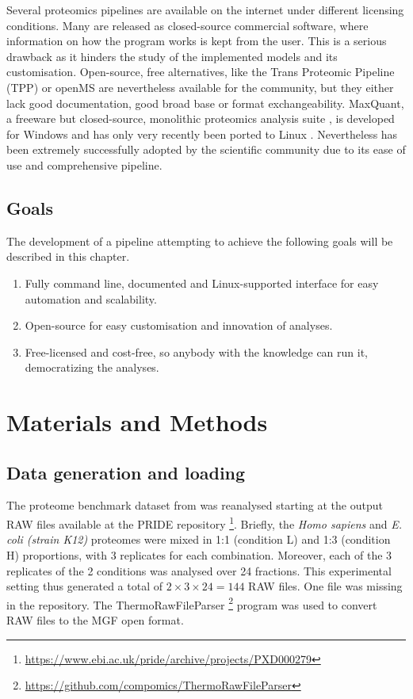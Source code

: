 Several proteomics pipelines are available on the internet under different licensing conditions. Many are released as closed-source commercial software, where information on how the program works is kept from the user. This is a serious drawback as it hinders the study of the implemented models and its customisation. Open-source, free alternatives, like the Trans Proteomic Pipeline (\ac{TPP}) \cite{Deutsch2011} or openMS \cite{Sturm2008} are nevertheless available for the community, but they either lack good documentation, good broad base or format exchangeability. MaxQuant, a freeware but closed-source, monolithic proteomics analysis suite \cite{Cox2008}, is developed for Windows and has only very recently been ported to Linux \cite{Sinitcyn2018}. Nevertheless has been extremely successfully adopted by the scientific community due to its ease of use and comprehensive pipeline.

\subsection{Goals}

The development of a pipeline attempting to achieve the following goals will be described in this chapter.

\begin{enumerate}

\item Fully command line, documented and Linux-supported interface for easy automation and scalability.
\item Open-source for easy customisation and innovation of analyses.
\item Free-licensed and cost-free, so anybody with the knowledge can run it, democratizing the analyses.
\end{enumerate}

\section{Materials and Methods}

\subsection{Data generation and loading}

The proteome benchmark dataset from \cite{Cox2014} was reanalysed starting at the output RAW files available at the PRIDE repository \footnote{\href{https://www.ebi.ac.uk/pride/archive/projects/PXD000279}{https://www.ebi.ac.uk/pride/archive/projects/PXD000279}}. Briefly, the \textit{Homo sapiens} and \textit{E. coli (strain K12)} proteomes were mixed in 1:1 (condition L) and 1:3 (condition H) proportions, with 3 replicates for each combination. Moreover, each of the 3 replicates of the 2 conditions was analysed over 24 fractions. This experimental setting thus generated a total of $2 \times 3 \times 24=144$ RAW files. One file was missing in the repository. The ThermoRawFileParser \footnote{\href{https://github.com/compomics/ThermoRawFileParser}{https://github.com/compomics/ThermoRawFileParser}} program was used to convert RAW files to the MGF open format.

